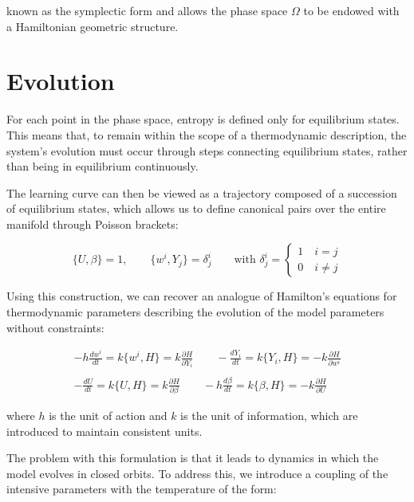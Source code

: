 \documentclass[12pt]{article}
\begin{document}
known as the symplectic form \cite{cannas_symph} and allows the phase space $\Omega$ to be endowed with a Hamiltonian geometric structure.

\section*{Evolution}

For each point in the phase space, entropy is defined only for equilibrium states. This means that, to remain within the scope of a thermodynamic description, the system's evolution must occur through steps connecting equilibrium states, rather than being in equilibrium continuously. 

The learning curve can then be viewed as a trajectory composed of a succession of equilibrium states, which allows us to define canonical pairs over the entire manifold through Poisson brackets:

\begin{equation}
\{U, \beta\} = 1, \qquad \{w^{i}, Y_{j} \} = \delta^{i}_{j} \qquad \text{with } \delta^{i}_{j} = \begin{cases} 1 \quad i = j \\ 0 \quad i \neq j \end{cases}
\end{equation}
 
Using this construction, we can recover an analogue of Hamilton's equations \cite{hamilton1834} for thermodynamic parameters describing the evolution of the model parameters without constraints:

\begin{equation}
\begin{aligned}
-h \frac{dw^{i}}{dt} = k\{w^{i}, H\} = k\frac{\partial H}{\partial Y_{i}} \qquad -\frac{dY_{i}}{dt} = k\{Y_{i}, H  \} = -k\frac{\partial H}{\partial w^{i}}
\\
\\
-\frac{dU}{dt} = k\{U, H \} = k\frac{\partial H}{\partial \beta} \qquad -h\frac{d\beta}{dt} = k\{\beta, H\} = -k\frac{\partial H}{\partial U}
\end{aligned}
\end{equation}

where $h$ is the unit of action and $k$ is the unit of information, which are introduced to maintain consistent units.

The problem with this formulation is that it leads to dynamics in which the model evolves in closed orbits. To address this, we introduce a coupling of the intensive parameters with the temperature of the form:
\end{document}
